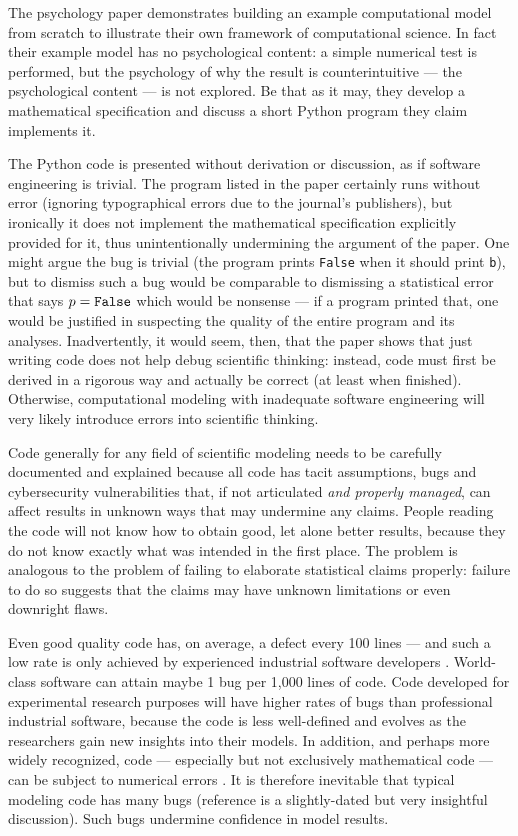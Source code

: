 \documentclass[10pt,letterpaper]{article}
\begin{document}
The psychology paper \cite{psychological-modeling} demonstrates building an example computational model from scratch to illustrate their own framework of computational science. In fact their example model has no psychological content: a simple numerical test is performed, but the psychology of why the result is counterintuitive --- the psychological content --- is not explored. Be that as it may, they develop a mathematical specification and discuss a short Python program they claim implements it. 

The Python code is presented without derivation or discussion, as if software engineering is trivial. The program listed in the paper certainly runs without error (ignoring typographical errors due to the journal's publishers), but ironically it does not implement the mathematical specification explicitly provided for it, thus unintentionally undermining the argument of the paper. One might argue the bug is trivial (the program prints \texttt{False} when it should print \texttt{b}), but to dismiss such a bug would be comparable to dismissing a statistical error that says $p=\mbox{\tt False}$ which would be nonsense --- if a program printed that, one would be justified in suspecting the quality of the entire program and its analyses. Inadvertently, it would seem, then, that the paper shows that just writing code does not help debug scientific thinking: instead, code must first be derived in a rigorous way and actually be correct (at least when finished). Otherwise, computational modeling with inadequate software engineering will very likely introduce errors into scientific thinking.

    Code generally for any field of scientific modeling needs to be carefully documented and explained because all code has tacit assumptions, bugs and cybersecurity vulnerabilities \cite{Ben,nature-review,se-bias} that, if not articulated \emph{and properly managed}, can affect results in unknown ways that may undermine any claims. People reading the code will not know how to obtain good, let alone better results, because they do not know exactly what was intended in the first place. The problem is analogous to the problem of failing to elaborate statistical claims properly: failure to do so suggests that the claims may have unknown limitations or even downright flaws.

Even good quality code has, on average, a defect every 100 lines --- and {such a low} rate is only achieved by experienced industrial software developers \cite{ourReview}. World-class software can attain maybe 1 bug per 1,000 lines of code. Code developed for experimental research purposes will have higher rates of bugs than professional industrial software, because the code is less well-defined and evolves as the researchers gain new insights into their models. In addition, and perhaps more widely recognized, code --- especially but not exclusively mathematical code --- can be subject to numerical errors \cite{hamming}. It is therefore inevitable that typical modeling code has many bugs (reference \cite{NVP} is a slightly-dated but very insightful discussion). Such bugs undermine confidence in model results. 
\end{document}
